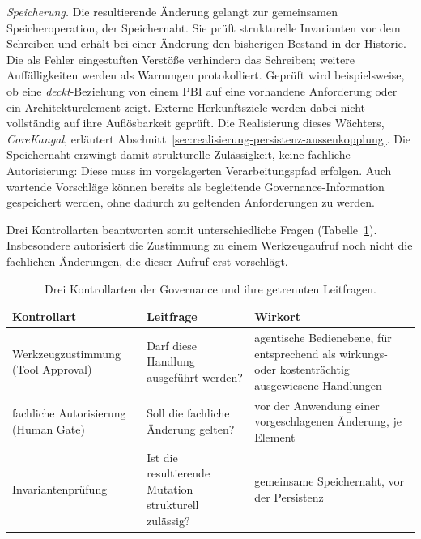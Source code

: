 \emph{Speicherung.} Die resultierende Änderung gelangt zur
gemeinsamen Speicheroperation, der Speichernaht. Sie prüft
strukturelle Invarianten vor dem Schreiben und erhält bei einer
Änderung den bisherigen Bestand in der Historie. Die als Fehler eingestuften
Verstöße verhindern das Schreiben; weitere Auffälligkeiten werden
als Warnungen protokolliert. Geprüft wird beispielsweise, ob eine
\emph{deckt}-Beziehung von einem PBI auf eine vorhandene Anforderung
oder ein Architekturelement zeigt. Externe Herkunftsziele werden
dabei nicht vollständig auf ihre Auflösbarkeit geprüft. Die
Realisierung dieses Wächters, \emph{CoreKangal}, erläutert
Abschnitt~\ref{sec:realisierung-persistenz-aussenkopplung}. Die Speichernaht
erzwingt damit strukturelle Zulässigkeit, keine fachliche
Autorisierung: Diese muss im vorgelagerten Verarbeitungspfad
erfolgen. Auch wartende Vorschläge können bereits als begleitende
Governance-Information gespeichert werden, ohne dadurch zu
geltenden Anforderungen zu werden.

Drei Kontrollarten beantworten somit unterschiedliche Fragen
(Tabelle~\ref{tab:kontrollarten}). Insbesondere autorisiert die
Zustimmung zu einem Werkzeugaufruf noch nicht die fachlichen
Änderungen, die dieser Aufruf erst vorschlägt.

\begin{table}[htbp]
  \centering
  \small
  \begin{tabular}{p{}p{}p{}}
    \hline
    \textbf{Kontrollart} & \textbf{Leitfrage} & \textbf{Wirkort} \\
    \hline
    Werkzeugzustimmung (Tool Approval) & Darf diese Handlung
      ausgeführt werden? & agentische Bedienebene, für entsprechend
      als wirkungs- oder kostenträchtig ausgewiesene Handlungen \\
    fachliche Autorisierung (Human Gate) & Soll die fachliche
      Änderung gelten? & vor der Anwendung einer vorgeschlagenen
      Änderung, je Element \\
    Invariantenprüfung & Ist die resultierende Mutation strukturell
      zulässig? & gemeinsame Speichernaht, vor der Persistenz \\
    \hline
  \end{tabular}
  \caption{Drei Kontrollarten der Governance und ihre getrennten
    Leitfragen.}
  \label{tab:kontrollarten}
\end{table}

